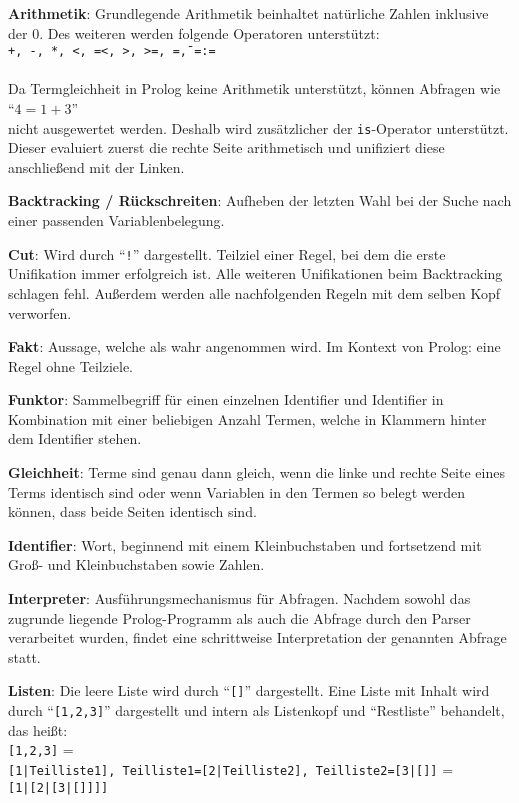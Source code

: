 \documentclass[parskip=full,11pt,twoside]{scrartcl}
\begin{document}
\textbf{Arithmetik}:
Grundlegende Arithmetik beinhaltet natürliche Zahlen inklusive der 0. Des weiteren werden folgende Operatoren unterstützt:\\
\texttt{+, -, *, <, =<, >, >=, =\=, =:=}\\
\\
Da Termgleichheit in Prolog keine Arithmetik unterstützt, können Abfragen wie\\
\enquote{$4 = 1 + 3$}\\
nicht ausgewertet werden. Deshalb wird zusätzlicher der \texttt{is}-Operator unterstützt. Dieser evaluiert zuerst die rechte Seite arithmetisch und unifiziert diese anschließend mit der Linken.

\textbf{Backtracking / Rückschreiten}:
Aufheben der letzten Wahl bei der Suche nach einer passenden Variablenbelegung.

\textbf{Cut}:
Wird durch \enquote{\texttt{!}} dargestellt. Teilziel einer Regel, bei dem die erste Unifikation immer erfolgreich ist. Alle weiteren Unifikationen beim Backtracking schlagen fehl. Außerdem werden alle nachfolgenden Regeln mit dem selben Kopf verworfen.

\textbf{Fakt}:
Aussage, welche als wahr angenommen wird. Im Kontext von Prolog: eine Regel ohne Teilziele.

\textbf{Funktor}:
Sammelbegriff für einen einzelnen Identifier und Identifier in Kombination mit einer beliebigen Anzahl Termen, welche in Klammern hinter dem Identifier stehen.

\textbf{Gleichheit}:
Terme sind genau dann gleich, wenn die linke und rechte Seite eines Terms identisch sind oder wenn Variablen in den Termen so belegt werden können, dass beide Seiten identisch sind.

\textbf{Identifier}:
Wort, beginnend mit einem Kleinbuchstaben und fortsetzend mit Groß- und Kleinbuchstaben sowie Zahlen.

\textbf{Interpreter}:
Ausführungsmechanismus für Abfragen. Nachdem sowohl das zugrunde liegende Prolog-Programm als auch die Abfrage durch den Parser verarbeitet wurden, findet eine schrittweise Interpretation der genannten Abfrage statt.

\textbf{Listen}:
Die leere Liste wird durch \enquote{\texttt{[]}} dargestellt. Eine Liste mit Inhalt wird durch \enquote{\texttt{[1,2,3]}} dargestellt und intern als Listenkopf und \enquote{Restliste} behandelt, das heißt:\\
\texttt{[1,2,3]} =\\
\texttt{[1|Teilliste1], Teilliste1=[2|Teilliste2], Teilliste2=[3|[]]} =\\
\texttt{[1|[2|[3|[]]]]}
\end{document}
